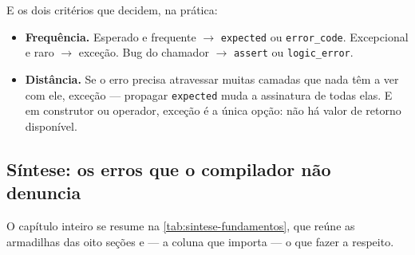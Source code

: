 E os dois critérios que decidem, na prática:

\begin{itemize}
    \item \textbf{Frequência.} Esperado e frequente $\rightarrow$
          \texttt{expected} ou \texttt{error\_code}. Excepcional e raro
          $\rightarrow$ exceção. Bug do chamador $\rightarrow$ \texttt{assert}
          ou \texttt{logic\_error}.
    \item \textbf{Distância.} Se o erro precisa atravessar muitas camadas que
          nada têm a ver com ele, exceção --- propagar \texttt{expected} muda a
          assinatura de todas elas. E em construtor ou operador, exceção é a
          única opção: não há valor de retorno disponível.
\end{itemize}

\subsection{Síntese: os erros que o compilador não denuncia}

O capítulo inteiro se resume na \cref{tab:sintese-fundamentos}, que reúne as
armadilhas das oito seções e --- a coluna que importa --- o que fazer a
respeito.

